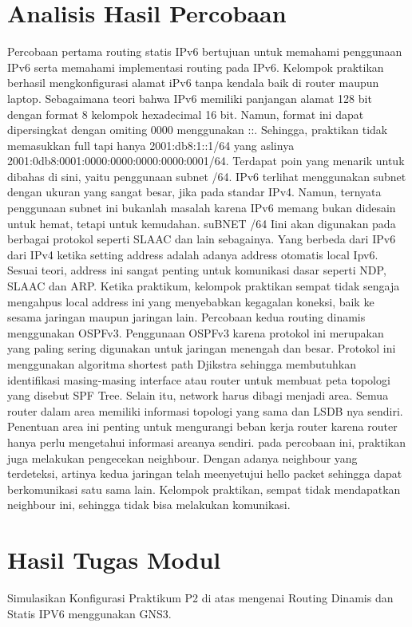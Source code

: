\section{Analisis Hasil Percobaan}
Percobaan pertama routing statis IPv6 bertujuan untuk memahami penggunaan IPv6 serta memahami implementasi routing pada IPv6. Kelompok praktikan berhasil mengkonfigurasi alamat iPv6 tanpa kendala baik di router maupun laptop. Sebagaimana teori bahwa IPv6 memiliki panjangan alamat 128 bit dengan format 8 kelompok hexadecimal 16 bit. Namun, format ini dapat dipersingkat dengan omiting 0000 menggunakan ::. Sehingga, praktikan tidak memasukkan full tapi hanya 2001:db8:1::1/64 yang aslinya 2001:0db8:0001:0000:0000:0000:0000:0001/64. Terdapat poin yang menarik untuk dibahas di sini, yaitu penggunaan subnet /64. IPv6 terlihat menggunakan subnet dengan ukuran yang sangat besar, jika pada standar IPv4. Namun, ternyata penggunaan subnet ini bukanlah masalah karena IPv6 memang bukan didesain untuk hemat, tetapi untuk kemudahan. suBNET /64 Iini akan digunakan pada berbagai protokol seperti SLAAC dan lain sebagainya. Yang berbeda dari IPv6 dari IPv4 ketika setting address adalah adanya address otomatis local Ipv6. Sesuai teori, address ini sangat penting untuk komunikasi dasar seperti NDP, SLAAC dan ARP. Ketika praktikum, kelompok praktikan sempat tidak sengaja mengahpus local address ini yang menyebabkan kegagalan koneksi, baik ke sesama jaringan maupun jaringan lain. Percobaan kedua routing dinamis menggunakan OSPFv3. Penggunaan OSPFv3 karena protokol ini merupakan yang paling sering digunakan untuk jaringan menengah dan besar. Protokol ini menggunakan algoritma shortest path Djikstra sehingga membutuhkan identifikasi masing-masing interface atau router untuk membuat peta topologi yang disebut SPF Tree. Selain itu, network harus dibagi menjadi area. Semua router dalam area memiliki informasi topologi yang sama dan LSDB nya sendiri. Penentuan area ini penting untuk mengurangi beban kerja router karena router hanya perlu mengetahui informasi areanya sendiri. pada percobaan ini, praktikan juga melakukan pengecekan neighbour. Dengan adanya neighbour yang terdeteksi, artinya kedua jaringan telah meenyetujui hello packet sehingga dapat berkomunikasi satu sama lain. Kelompok praktikan, sempat tidak mendapatkan neighbour ini, sehingga tidak bisa melakukan komunikasi.

\section{Hasil Tugas Modul}
Simulasikan Konfigurasi Praktikum P2 di atas mengenai Routing Dinamis dan Statis IPV6 menggunakan GNS3. \\

